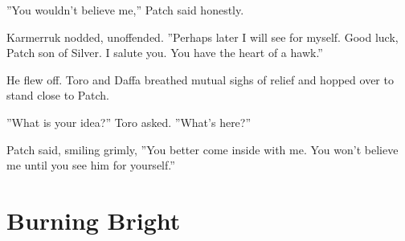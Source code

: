 \documentclass[12pt]{book}
\begin{document}
 ''You wouldn't believe me,'' Patch said honestly.\par
 Karmerruk nodded, unoffended. ''Perhaps later I will see for myself. Good luck, Patch son of Silver. I salute you. You have the heart of a hawk.''\par
 He flew off. Toro and Daffa breathed mutual sighs of relief and hopped over to stand close to Patch.\par
 ''What is your idea?'' Toro asked. ''What's here?''\par
 Patch said, smiling grimly, ''You better come inside with me. You won't believe me until you see him for yourself.''\par

\section{Burning Bright}
\end{document}
